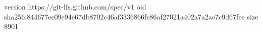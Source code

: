 version https://git-lfs.github.com/spec/v1
oid sha256:844677ec09e94e67db8702c46af3336866fe86af27021a402a7a2ae7c9d67fee
size 8901
